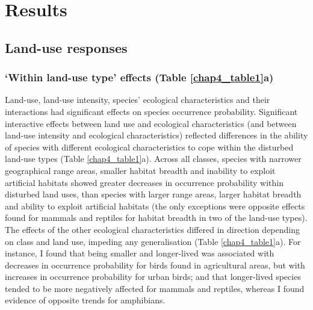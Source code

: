 \section{Results}

\subsection{Land-use responses}

\subsubsection{`Within land-use type' effects (Table \ref{chap4_table1}a)}
Land-use, land-use intensity, species' ecological characteristics and their interactions had significant effects on species occurrence probability. Significant interactive effects between land use and ecological characteristics (and between land-use intensity and ecological characteristics) reflected differences in the ability of species with different ecological characteristics to cope within the disturbed land-use types (Table \ref{chap4_table1}a). Across all classes, species with narrower geographical range areas, smaller habitat breadth and inability to exploit artificial habitats showed greater decreases in occurrence probability within disturbed land uses, than species with larger range areas, larger habitat breadth and ability to exploit artificial habitats (the only exceptions were opposite effects found for mammals and reptiles for habitat breadth in two of the land-use types). The effects of the other ecological characteristics differed in direction depending on class and land use, impeding any generalisation (Table \ref{chap4_table1}a). For instance, I found that being smaller and longer-lived was associated with decreases in occurrence probability for birds found in agricultural areas, but with increases in occurrence probability for urban birds; and that  longer-lived species tended to be more negatively affected for mammals and reptiles, whereas I found evidence of opposite trends for amphibians.

